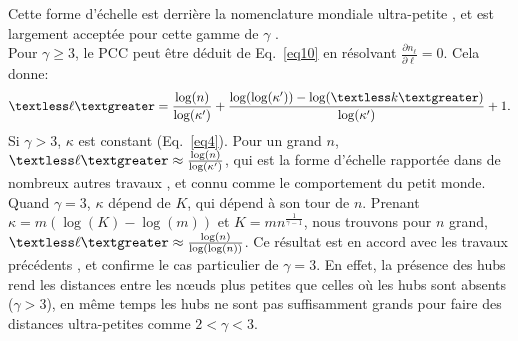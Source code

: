 Cette forme d'échelle est derrière la nomenclature mondiale ultra-petite \cite{Cohen-Havlin2003}, et est largement acceptée pour cette gamme de $\gamma $ \cite{Do-al2003,Cohen-al2002,Chung-Lu2002,Fox-Bellwood2014,Hofstad-al2014}.\\
Pour $\gamma\ge 3 $, le PCC peut être déduit de Eq.~\eqref{eq10} en résolvant $\frac{\partial n_{\ell}}{\partial\ell}=0$. Cela donne:
\begin{align}
	\textless \ell \textgreater=\frac{\log (n)}{\log(\kappa')}+\frac{\log(\log(\kappa'))-\log(\km)}{\log(\kappa')}+1.
	\label{eq13}
\end{align}
Si $\gamma>3$, $\kappa$ est constant (Eq.~\eqref{eq4}). Pour un grand $n$, $\textless\ell\textgreater\approx\frac{\log(n)} {\log (\kappa')}$, qui est la forme d'échelle rapportée dans de nombreux autres travaux \cite{Bollobas1985,Chung-Lu2002,Fronczak-al2004,Hofstad-al2004,Cohen-Havlin2009}, et connu comme le comportement du petit monde. \\
Quand $\gamma=3$, $\kappa$ dépend de $K$, qui dépend à son tour de $n$. Prenant $\kappa=m(\log(K)-\log(m))$ et $K=mn^{\frac{1}{\gamma-1}}$, nous trouvons pour  $n$ grand, $\textless\ell\textgreater\approx \frac{\log(n)} {\log(\log(n))} $. Ce résultat est en accord avec les travaux précédents \cite {Chung-Lu2002,Cohen-Havlin2003,Fronczak-al2004,Bollobas-Riodan2002}, et confirme le cas particulier de $ \gamma = 3 $. En effet, la présence des hubs rend les distances entre les nœuds plus petites que celles où les hubs sont absents ($\gamma>3$), en même temps les hubs ne sont pas suffisamment grands pour faire des distances ultra-petites comme $2<\gamma<3$.  
 
